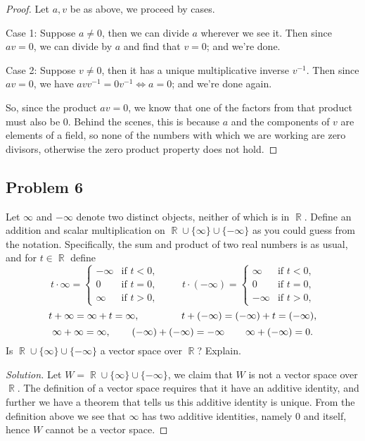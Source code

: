 \documentclass[letterpaper, 12pt]{amsart}
\DeclareMathOperator{\R}{\mathbb{R}}
\theoremstyle{definition}  %
\begin{document}
		\begin{proof}
		Let $a,v$ be as above, we proceed by cases.
		
		Case 1: Suppose $a \neq 0$, then we can divide $a$ wherever we see it.
		Then since $av = 0$, we can divide by $a$ and find that $v = 0$; and we're done.

		Case 2: Suppose $v \neq 0$, then it has a unique multiplicative inverse $v^{-1}$.
		Then since $av = 0$, we have $avv^{-1} = 0v^{-1} \iff a = 0$; and we're done again.

		So, since the product $av = 0$, we know that one of the factors from that product must also be 0.
		Behind the scenes, this is because $a$ and the components of $v$ are elements of a field, so none of the numbers with which we are working are zero divisors, otherwise the zero product property does not hold.
		\end{proof}

		\subsection*{Problem 6}
		Let $\infty$ and $-\infty$ denote two distinct objects, neither of which is in $\R$.
		Define an addition and scalar multiplication on $\R \cup \{\infty\} \cup \{-\infty\}$ as you could guess from the notation.
		Specifically, the sum and product of two real numbers is as usual, and for $t \in \R$ define \[ t \cdot \infty = \begin{cases} -\infty & \text{if $t < 0$,} \\ 0 & \text{if $t = 0$,} \\ \infty & \text{if $t > 0$,} \end{cases} \hspace{1cm} t \cdot (-\infty) = \begin{cases} \infty & \text{if $t < 0$,} \\ 0 & \text{if $t = 0$,} \\ -\infty & \text{if $t > 0$,} \end{cases} \]
		\[ t + \infty = \infty + t = \infty, \hspace{1.5cm} t + (-\infty) = (-\infty) + t = (-\infty), \]
		\[ \infty + \infty = \infty, \hspace{.75cm} (-\infty) + (-\infty) = -\infty \hspace{.75cm} \infty + (-\infty) = 0. \]
		Is $\R \cup \{\infty\} \cup \{-\infty\}$ a vector space over $\R$?
		Explain.

		\begin{proof}[Solution]
		Let $W = \R \cup \{ \infty \} \cup \{ -\infty \}$, we claim that $W$ is not a vector space over $\R$.
		The definition of a vector space requires that it have an additive identity, and further we have a theorem that tells us this additive identity is unique. 
		From the definition above we see that $\infty$ has two additive identities, namely 0 and itself, hence $W$ cannot be a vector space.
		\end{proof}
\end{document}
